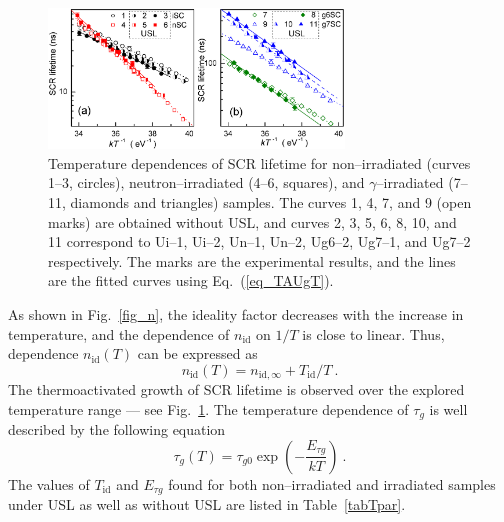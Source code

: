 \documentclass[aip,jap, amsmath,amssymb,reprint]{revtex4-1}
\begin{document}
\begin{figure}
\includegraphics[width=0.7\textwidth]{fig_4ab}%
\caption{\label{fig_TAUg}
Temperature dependences of SCR lifetime for non--irradiated (curves 1--3, circles),
neutron--irradiated (4--6, squares), and $\gamma$--irradiated (7--11, diamonds and triangles) samples.
The curves 1, 4, 7, and 9 (open marks) are obtained without USL,
and curves 2, 3, 5, 6, 8, 10, and 11 correspond to
Ui--1, Ui--2, Un--1, Un--2, Ug6--2, Ug7--1, and Ug7--2 respectively.
The marks are the experimental results, and the lines are the fitted curves using Eq.~(\ref{eq_TAUgT}).
}%
\end{figure}

As shown in Fig.~\ref{fig_n}, the ideality factor decreases with the increase in temperature, and the  dependence of $n_{\mathrm{id}}$ on $1/T$  is close to linear.
Thus, dependence $n_{\mathrm{id}}(T)$ can be expressed as
\begin{equation}
\label{eq_nT}
    n_{\mathrm{id}}(T)=n_{\mathrm{id},\infty}+T_{\mathrm{id}}/T\:.
\end{equation}
The thermoactivated growth of SCR lifetime is observed over the explored temperature range --- see Fig.~\ref{fig_TAUg}.
The temperature dependence of $\tau_{g}$ is well described by the following equation
\begin{equation}
\label{eq_TAUgT}
    \tau_{g}(T)=\tau_{g0}\exp\left(-\frac{E_{\tau g}}{kT}\right)\:.
\end{equation}
The values of $T_{\mathrm{id}}$ and $E_{\tau g}$ found for both non--irradiated and irradiated samples under USL as well as without USL are listed in Table~\ref{tabTpar}.
\end{document}
